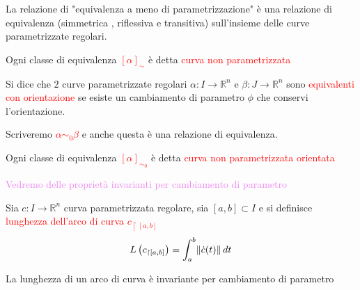         \begin{definizione}
        La relazione di "equivalenza a meno di parametrizzazione" è una relazione di equivalenza (simmetrica , riflessiva e transitiva) sull'insieme
        delle curve parametrizzate regolari.

        Ogni classe di equivalenza \textcolor{red}{$\left[ \alpha \right]_{\sim}$} è detta \textcolor{red}{curva non parametrizzata} 
        \end{definizione}
        \begin{definizione}
        Si dice che $2$ curve parametrizzate regolari $\alpha: I \to \mathbb{R}^n$ e $\beta: J \to \mathbb{R}^n$ sono \textcolor{red}{equivalenti con orientazione} se 
        esiste un cambiamento di parametro $\phi$ che conservi l'orientazione.
        
        Scriveremo \textcolor{red}{$\alpha \sim_0 \beta$} e anche questa è una relazione di equivalenza.
        
        Ogni classe di equivalenza \textcolor{red}{$\left[\alpha\right]_{\sim_0}$} è detta \textcolor{red}{curva non parametrizzata orientata}

        \textcolor{violet}{Vedremo delle proprietà invarianti per cambiamento di parametro}
        \end{definizione}
        \newpage
        \begin{definizione}
        Sia $c: I \to \mathbb{R}^n$ curva parametrizzata regolare, sia $[a,b] \subset I$ e si definisce \textcolor{red}{lunghezza dell'arco di curva $c_{\restriction{[a,b]}}$}
        \begin{equation}
        \label{eq:lunghezza_arco_di_curva}
        L \left(c_{\restriction{[a,b]}}\right)= \int_a^b \lVert\dot{c}(t)\rVert \, dt
        \end{equation}
        \end{definizione}
        \begin{proposizione}
        \label{prop:lunghezza_arco_di_curva_invariante}
        La lunghezza di un arco di curva è invariante per cambiamento di parametro
        \end{proposizione}
